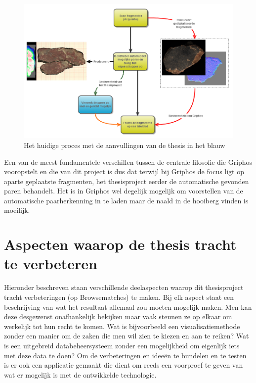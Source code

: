 \begin{figure}[ht]
	\begin{center}
		\includegraphics[width=1.0\columnwidth]{images/flowchart-focus-01.png}
		\caption{Het huidige proces met de aanvullingen van de thesis in het blauw}
		\label{fig:flow}
	\end{center}
\end{figure}

Een van de meest fundamentele verschillen tussen de centrale filosofie die Griphos vooropstelt en die van dit project is dus dat terwijl bij Griphos de focus ligt op aparte geplaatste fragmenten, het thesisproject eerder de automatische gevonden paren behandelt. Het is in Griphos wel degelijk mogelijk om voorstellen van de automatische paarherkenning in te laden maar de naald in de hooiberg vinden is moeilijk.\\

\section{Aspecten waarop de thesis tracht te verbeteren}
Hieronder beschreven staan verschillende deelaspecten waarop dit thesisproject tracht verbeteringen (op Browsematches) te maken. Bij elk aspect staat een beschrijving van wat het resultaat allemaal zou moeten mogelijk maken. Men kan deze desgewenst onafhankelijk bekijken maar vaak steunen ze op elkaar om werkelijk tot hun recht te komen. Wat is bijvoorbeeld een visualisatiemethode zonder een manier om de zaken die men wil zien te kiezen en aan te reiken? Wat is een uitgebreid databeheersysteem zonder een mogelijkheid om eigenlijk iets met deze data te doen? Om de verbeteringen en idee\"en te bundelen en te testen is er ook een applicatie gemaakt die dient om reeds een voorproef te geven van wat er mogelijk is met de ontwikkelde technologie.  

